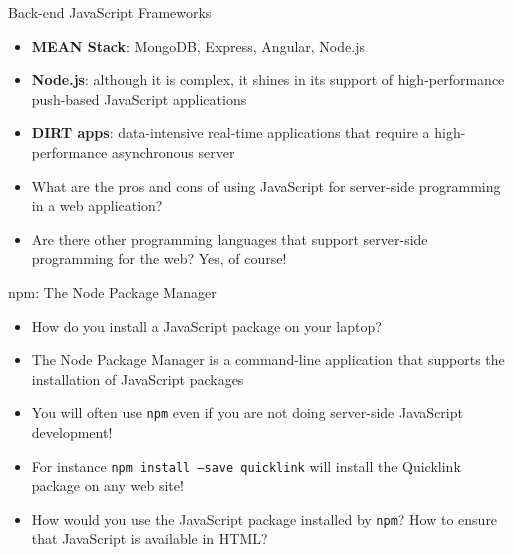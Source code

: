 \documentclass[14pt,aspectratio=169]{beamer}
\begin{document}
%
\begin{frame}{Back-end JavaScript Frameworks}
  \begin{itemize}
    \item {\bf MEAN Stack}: MongoDB, Express, Angular, Node.js
      \vspace*{-.15in}
    \item {\bf Node.js}: although it is complex, it shines in its support of
      high-performance push-based JavaScript applications
      \vspace*{-.15in}
    \item {\bf DIRT apps}: data-intensive real-time applications that require a
      high-performance asynchronous server
      \vspace*{-.15in}
    \item What are the pros and cons of using JavaScript for server-side
      programming in a web application?
      \vspace*{-.15in}
    \item Are there other programming languages that support server-side
      programming for the web? Yes, of course!
  \end{itemize}
\end{frame}

%
\begin{frame}{npm: The Node Package Manager}
  \begin{itemize}
    \item How do you install a JavaScript package on your laptop?
      \vspace*{-.15in}
    \item The Node Package Manager is a command-line application that supports
      the installation of JavaScript packages
      \vspace*{-.15in}
    \item You will often use {\tt npm} even if you are not doing server-side
      JavaScript development!
      \vspace*{-.15in}
    \item For instance {\tt npm install --save quicklink} will install the
      Quicklink package on any web site!
      \vspace*{-.15in}
    \item How would you use the JavaScript package installed by {\tt npm}? How
      to ensure that JavaScript is available in HTML?
  \end{itemize}
\end{frame}
\end{document}
